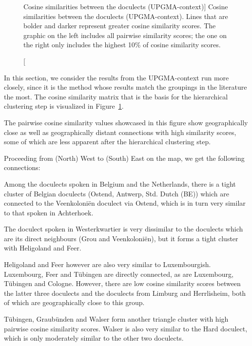 \documentclass[a4paper]{article}
\begin{document}
\begin{figure}[h]

\hspace{-4em}

\caption
[Cosine similarities between the doculects (UPGMA-context)]
{
Cosine similarities between the doculects (UPGMA-context).
Lines that are bolder and darker represent greater cosine similarity scores.
The graphic on the left includes all pairwise similarity scores;
the one on the right only includes the highest 10\% of cosine similarity scores.
}
\label{fig:cosine}
\end{figure}

In this section, we consider the results from
the UPGMA-context run more closely,
since it is the method whose results match the
groupings in the literature the most.
The cosine similarity matrix that is the basis for the
hierarchical clustering step is visualized in Figure~\ref{fig:cosine}.

The pairwise cosine similarity values showcased in this figure
show geographically close as well as geographically distant connections
with high similarity scores,
some of which are less apparent after the hierarchical clustering step.

Proceeding from (North) West to (South) East on the map,
we get the following connections:

Among the doculects spoken in Belgium and the Netherlands,
there is a tight cluster of Belgian doculects (Ostend, Antwerp, Std. Dutch (BE))
which are connected to the Veenkoloni\"{e}n doculect via Ostend,
which is in turn very similar to that spoken in Achterhoek.

The doculect spoken in Westerkwartier is very dissimilar to
the doculects which are its direct neighbours (Grou and Veenkoloni\"{e}n),
but it forms a tight cluster with Heligoland and Feer.

Heligoland and Feer however are also very similar to Luxembourgish.
Luxembourg, Feer and T\"{u}bingen are directly connected,
as are Luxembourg, T\"{u}bingen and Cologne.
However, there are low cosine similarity scores between
the latter three doculects and
the doculects from Limburg and Herrlisheim,
both of which are geographically close to this group.

T\"{u}bingen, Graub\"{u}nden and Walser form another
triangle cluster with high pairwise cosine similarity scores.
Walser is also very similar to the Hard doculect,
which is only moderately similar to the other two doculects.
\end{document}
